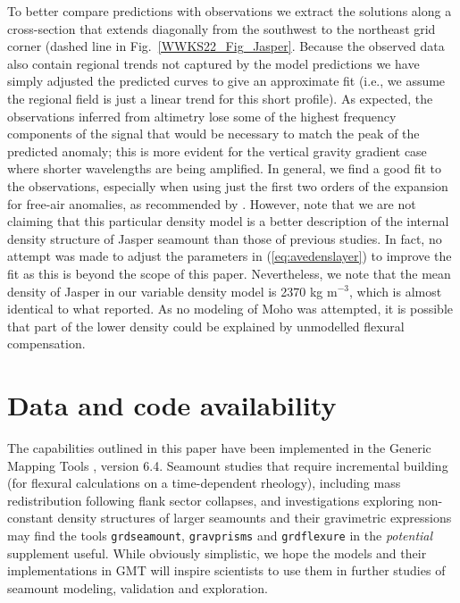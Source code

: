 To better compare predictions with observations we extract the solutions along a cross-section that extends diagonally
from the southwest to the northeast grid corner (dashed line in Fig.~\ref{WWKS22_Fig_Jasper}.  Because the observed data
also contain regional trends not captured by the model predictions we have simply adjusted the predicted curves to
give an approximate fit (i.e., we assume the regional field is just a linear trend for this short profile).  As expected,
the observations inferred from altimetry lose some of the highest frequency components of the signal that would be
necessary to match the peak of the predicted anomaly; this is more evident for the vertical gravity gradient case where shorter
wavelengths are being amplified.  In general, we find a good fit to the observations, especially when using just the first
two orders of the \citet{P1972} expansion for free-air anomalies, as recommended by \citet{MS2007}.  However, note that we
are not claiming that this particular density model is a better description of the  internal density structure of Jasper
seamount than those of previous studies.  In fact, no attempt was made to adjust the parameters in (\ref{eq:avedenslayer})
to improve the fit as this is beyond the scope of this paper. Nevertheless, we note that the mean density of Jasper in
our variable density model is 2370 kg m$^{-3}$, which is almost identical to what \citet{H1991} reported. As no modeling of
Moho was attempted, it is possible that part of the lower density could be explained by unmodelled flexural compensation.

\section{Data and code availability}

The capabilities outlined in this paper have been implemented in the Generic Mapping Tools \citep{Wetal2019}, version 6.4.
Seamount studies that require incremental building (for flexural calculations on a time-dependent rheology), including
mass redistribution following flank sector collapses, and investigations exploring non-constant density structures of larger
seamounts and their gravimetric expressions may find the tools \texttt{grdseamount}, \texttt{gravprisms} and \texttt{grdflexure}
in the {\it potential} supplement useful. While obviously simplistic, we hope the models and their implementations
in GMT will inspire scientists to use them in further studies of seamount modeling, validation and exploration.

